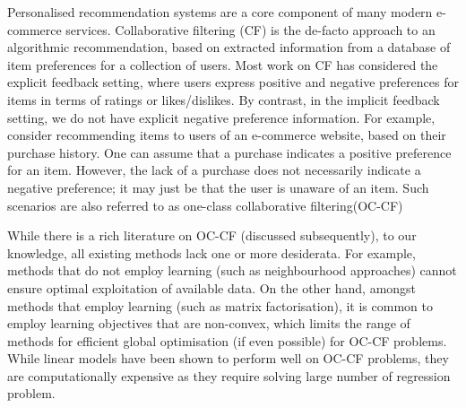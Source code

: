 Personalised recommendation systems are a core component
of many modern e-commerce services. Collaborative
filtering (CF) is the de-facto approach to an algorithmic recommendation,
based on extracted information from a database
of item preferences for a collection of users. Most work on CF has considered 
the explicit feedback
setting, where users express positive and negative preferences
for items in terms of ratings or likes/dislikes. By
contrast, in the implicit feedback setting, we do not have
explicit negative preference information. For example, consider
recommending items to users of an e-commerce website,
based on their purchase history. One can assume that a
purchase indicates a positive preference for an item. However,
the lack of a purchase does not necessarily indicate
a negative preference; it may just be that the user is unaware
of an item. Such scenarios are also referred to as one-class collaborative
filtering(OC-CF)


While there is a rich literature on OC-CF (discussed subsequently),
to our knowledge, all existing methods lack one
or more desiderata. For example, methods that do not employ
learning (such as neighbourhood approaches) cannot
ensure optimal exploitation of available data. On the other hand,
amongst methods that employ learning (such as matrix factorisation),
it is common to employ learning objectives that
are non-convex, which limits the range of methods for 
efficient global optimisation (if even possible) for OC-CF problems.
While linear models have been shown to perform well on OC-CF problems, they are
computationally expensive as they require solving large number of regression
problem.

